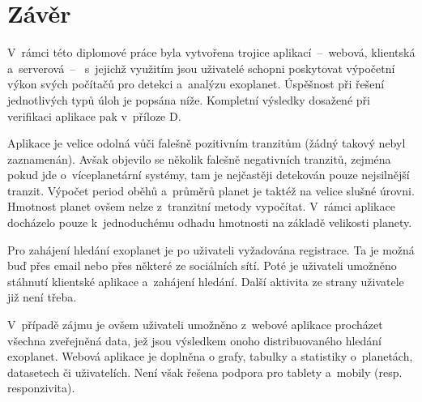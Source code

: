\documentclass[a4paper,12pt]{article}
\begin{document}
{{{{{{{{{{{{

\clearpage\pagestyle{plain}
\section*{Závěr}

V~rámci této diplomové práce byla vytvořena trojice aplikací~--~webová, klientská a~serverová~--~ s~jejichž využitím jsou uživatelé schopni poskytovat výpočetní výkon svých počítačů pro detekci a~analýzu exoplanet. Úspěšnost při řešení jednotlivých typů úloh je popsána níže. Kompletní výsledky dosažené při verifikaci aplikace pak v~příloze D.

{

Aplikace je velice odolná vůči falešně pozitivním tranzitům (žádný takový nebyl zaznamenán). Avšak objevilo se několik falešně negativních tranzitů, zejména pokud jde o~víceplanetární systémy, tam je nejčastěji detekován pouze nejsilnější tranzit. Výpočet period oběhů a~průměrů planet je taktéž na velice slušné úrovni. Hmotnost planet ovšem nelze z~tranzitní metody vypočítat. V~rámci aplikace docházelo pouze k~jednoduchému odhadu hmotnosti na základě velikosti planety.


Pro zahájení hledání exoplanet je po uživateli vyžadována registrace. Ta je možná buď přes email nebo přes některé ze sociálních sítí. Poté je uživateli umožněno stáhnutí klientské aplikace a~zahájení hledání. Další aktivita ze strany uživatele již není třeba.

V~případě zájmu je ovšem uživateli umožněno z~webové aplikace procházet všechna zveřejněná data, jež jsou výsledkem onoho distribuovaného hledání exoplanet. Webová aplikace je doplněna o grafy, tabulky a statistiky o~planetách, datasetech či uživatelích. Není však řešena podpora pro tablety a~mobily (resp. responzivita).

}}}}}}}}}}}}}
\end{document}
